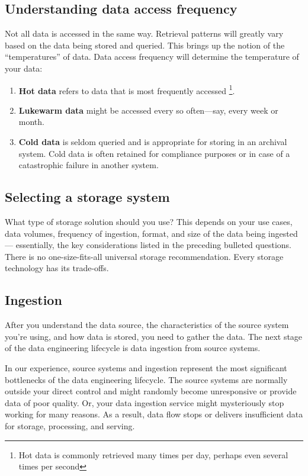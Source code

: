 \subsection*{Understanding data access frequency}
Not all data is accessed in the same way. Retrieval patterns will greatly vary based on
the data being stored and queried. This brings up the notion of the “temperatures” of
data. Data access frequency will determine the temperature of your data:
\begin{enumerate}
    \item \textbf{Hot data} refers to data that is most frequently accessed
    \footnote{
        Hot data is commonly retrieved many times per day,
        perhaps even several times per second
    }.

    \item \textbf{Lukewarm data} might be accessed every so
    often—say, every week or month.

    \item \textbf{Cold data} is seldom queried and is appropriate for storing in an archival system. Cold
    data is often retained for compliance purposes or in case of a catastrophic failure in
    another system.
\end{enumerate}



\subsection*{Selecting a storage system}
What type of storage solution should you use? This depends on your use cases,
data volumes, frequency of ingestion, format, and size of the data being ingested—
essentially, the key considerations listed in the preceding bulleted questions. There
is no one-size-fits-all universal storage recommendation. Every storage technology
has its trade-offs.




\subsection{Ingestion}
After you understand the data source, the characteristics of the source system you're
using, and how data is stored, you need to gather the data. The next stage of the data
engineering lifecycle is data ingestion from source systems.

In our experience, source systems and ingestion represent the most significant bottlenecks
of the data engineering lifecycle. The source systems are normally outside
your direct control and might randomly become unresponsive or provide data of
poor quality. Or, your data ingestion service might mysteriously stop working for
many reasons. As a result, data flow stops or delivers insufficient data for storage,
processing, and serving.



